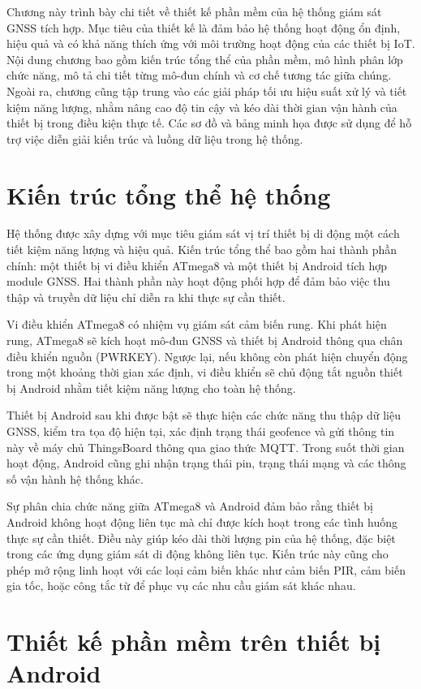 \documentclass[../DoAn.tex]{subfiles}
\begin{document}
Chương này trình bày chi tiết về thiết kế phần mềm của hệ thống giám sát GNSS tích hợp. Mục tiêu của thiết kế là đảm bảo hệ thống hoạt động ổn định, hiệu quả và có khả năng thích ứng với môi trường hoạt động của các thiết bị IoT. Nội dung chương bao gồm kiến trúc tổng thể của phần mềm, mô hình phân lớp chức năng, mô tả chi tiết từng mô-đun chính và cơ chế tương tác giữa chúng. Ngoài ra, chương cũng tập trung vào các giải pháp tối ưu hiệu suất xử lý và tiết kiệm năng lượng, nhằm nâng cao độ tin cậy và kéo dài thời gian vận hành của thiết bị trong điều kiện thực tế. Các sơ đồ và bảng minh họa được sử dụng để hỗ trợ việc diễn giải kiến trúc và luồng dữ liệu trong hệ thống.
\section{Kiến trúc tổng thể hệ thống}
\label{section:4.1}
Hệ thống được xây dựng với mục tiêu giám sát vị trí thiết bị di động một cách tiết kiệm năng lượng và hiệu quả. Kiến trúc tổng thể bao gồm hai thành phần chính: một thiết bị vi điều khiển ATmega8 và một thiết bị Android tích hợp module GNSS. Hai thành phần này hoạt động phối hợp để đảm bảo việc thu thập và truyền dữ liệu chỉ diễn ra khi thực sự cần thiết.

Vi điều khiển ATmega8 có nhiệm vụ giám sát cảm biến rung. Khi phát hiện rung, ATmega8 sẽ kích hoạt mô-đun GNSS và thiết bị Android thông qua chân điều khiển nguồn (PWRKEY). Ngược lại, nếu không còn phát hiện chuyển động trong một khoảng thời gian xác định, vi điều khiển sẽ chủ động tắt nguồn thiết bị Android nhằm tiết kiệm năng lượng cho toàn hệ thống.

Thiết bị Android sau khi được bật sẽ thực hiện các chức năng thu thập dữ liệu GNSS, kiểm tra tọa độ hiện tại, xác định trạng thái geofence và gửi thông tin này về máy chủ ThingsBoard thông qua giao thức MQTT. Trong suốt thời gian hoạt động, Android cũng ghi nhận trạng thái pin, trạng thái mạng và các thông số vận hành hệ thống khác.

Sự phân chia chức năng giữa ATmega8 và Android đảm bảo rằng thiết bị Android không hoạt động liên tục mà chỉ được kích hoạt trong các tình huống thực sự cần thiết. Điều này giúp kéo dài thời lượng pin của hệ thống, đặc biệt trong các ứng dụng giám sát di động không liên tục. Kiến trúc này cũng cho phép mở rộng linh hoạt với các loại cảm biến khác như cảm biến PIR, cảm biến gia tốc, hoặc công tắc từ để phục vụ các nhu cầu giám sát khác nhau.

\section{Thiết kế phần mềm trên thiết bị Android}
\label{section:4.2}
\end{document}
